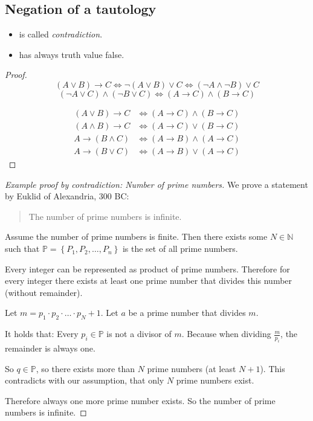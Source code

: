 \documentclass[a4paper,landscape,twocolumn]{article}
\theoremstyle{definition}
\newcommand\set[1]{\left\{#1\right\}}
\begin{document}
\subsection{Negation of a tautology}
\begin{itemize}
  \item is called \emph{contradiction}.
  \item has always truth value false.
\end{itemize}

\begin{proof}
  \[ (A \lor B) \rightarrow C \Leftrightarrow \neg (A \lor B) \lor C \Leftrightarrow (\neg A \land \neg B) \lor C \]
  \[ (\neg A \lor C) \land (\neg B \lor C) \Leftrightarrow (A \rightarrow C) \land (B \rightarrow C) \]

  \begin{align*}
    (A \lor B) \rightarrow C &\Leftrightarrow (A \rightarrow C) \land (B \rightarrow C) \\
    (A \land B) \rightarrow C &\Leftrightarrow (A \rightarrow C) \lor (B \rightarrow C) \\
    A \rightarrow (B \land C) &\Leftrightarrow (A \rightarrow B) \land (A \rightarrow C) \\
    A \rightarrow (B \lor C) &\Leftrightarrow (A \rightarrow B) \lor (A \rightarrow C)
  \end{align*}
\end{proof}

\begin{proof}[Example proof by contradiction: Number of prime numbers]
  We prove a statement by Euklid of Alexandria, 300 BC:
  \begin{quote}
    The number of prime numbers is infinite.
  \end{quote}

  Assume the number of prime numbers is finite.
  Then there exists some $N \in \mathbb N$ such that $\mathbb P = \set{P_1, P_2, \ldots, P_n}$
  is the set of all prime numbers.

  Every integer can be represented as product of prime numbers.
  Therefore for every integer there exists at least one prime number that divides this number (without remainder).

  Let $m = p_1 \cdot p_2 \cdot \ldots \cdot p_N + 1$.
  Let $a$ be a prime number that divides $m$.

  It holds that: Every $p_i \in \mathbb P$ is not a divisor of $m$.
  Because when dividing $\frac{m}{p_i}$, the remainder is always one.

  So $q \in \mathbb P$, so there exists more than $N$ prime numbers (at least $N+1$).
  This contradicts with our assumption, that only $N$ prime numbers exist.

  Therefore always one more prime number exists. So the number of prime numbers is infinite.
\end{proof}
\end{document}
